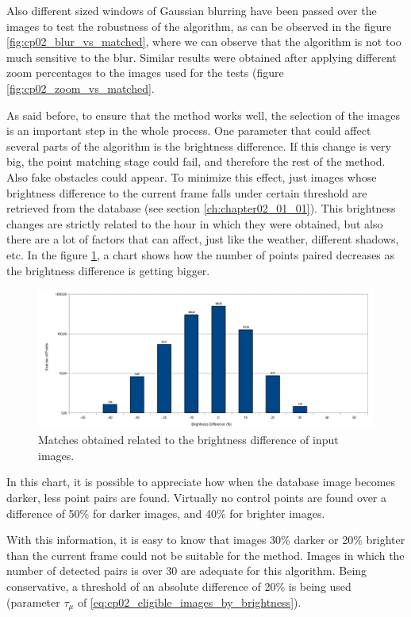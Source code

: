 Also different sized windows of Gaussian blurring have been passed over the images to test the robustness of the algorithm, as can be observed in the figure \ref{fig:cp02_blur_vs_matched}, where we can observe that the algorithm is not too much sensitive to the blur. Similar results were obtained after applying different zoom percentages to the images used for the tests (figure \ref{fig:cp02_zoom_vs_matched}.

As said before, to ensure that the method works well, the selection of the images is an important step in the whole process. One parameter that could affect several parts of the algorithm is the brightness difference. If this change is very big, the point matching stage could fail, and therefore the rest of the method. Also fake obstacles could appear. To minimize this effect, just images whose brightness difference to the current frame falls under certain threshold are retrieved from the database (see section \ref{ch:chapter02_01_01}). This brightness changes are strictly related to the hour in which they were obtained, but also there are a lot of factors that can affect, just like the weather, different shadows, etc. In the figure \ref{fig:cp02_brightness_vs_matches}, a chart shows how the number of points paired decreases as the brightness difference is getting bigger.

\begin{figure}[h!]
\centering
\includegraphics[width=\textwidth]{brightness_vs_matches}
\caption{Matches obtained related to the brightness difference of input images.}\label{fig:cp02_brightness_vs_matches}
\end{figure}

In this chart, it is possible to appreciate how when the database image becomes darker, less point pairs are found. Virtually no control points are found over a difference of 50\% for darker images, and 40\% for brighter images.

With this information, it is easy to know that images 30\% darker or 20\% brighter than the current frame could not be suitable for the method. Images in which the number of detected pairs is over 30 are adequate for this algorithm. Being conservative, a threshold of an absolute difference of 20\% is being used (parameter $\tau_{\mu}$ of \ref{eq:cp02_eligible_images_by_brightness}).

